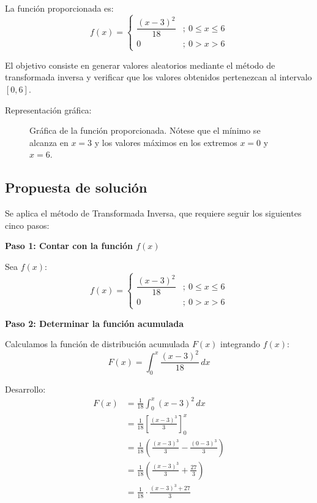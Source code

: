 \documentclass[12pt, a4paper]{article}
\begin{document}
La función proporcionada es:
\[
f(x)=\begin{cases}\dfrac{(x-3)^2}{18} &;\ 0 \leq x \leq 6 \\ 0 &;\ 0 > x > 6\end{cases}
\]

El objetivo consiste en generar valores aleatorios mediante el método de transformada inversa y verificar que los valores obtenidos pertenezcan al intervalo $[0,6]$.

Representación gráfica:

\begingroup
{}
\begin{figure}[H]
\centering
{}
\caption{Gráfica de la función proporcionada. Nótese que el mínimo se alcanza en $x=3$ y los valores máximos en los extremos $x=0$ y $x=6$.}
\end{figure}
\endgroup

\subsection{Propuesta de solución}

Se aplica el método de Transformada Inversa, que requiere seguir los siguientes cinco pasos:

\textbf{Paso 1: Contar con la función $f(x)$}

Sea $f(x)$:
\[
f(x)=\begin{cases}\dfrac{(x-3)^2}{18} &;\ 0 \leq x \leq 6 \\ 0 &;\ 0 > x > 6\end{cases}
\]

\textbf{Paso 2: Determinar la función acumulada}

Calculamos la función de distribución acumulada $F(x)$ integrando $f(x)$:
\[F(x) = \int_0^x \frac{(x-3)^2}{18}\, dx\]

Desarrollo:
\begin{align*}
F(x) &= \frac{1}{18} \int_0^x (x-3)^2\, dx \\[4pt]
     &= \frac{1}{18} \left[\frac{(x-3)^3}{3}\right]_0^x \\[4pt]
     &= \frac{1}{18} \left(\frac{(x-3)^3}{3} - \frac{(0-3)^3}{3}\right) \\[4pt]
     &= \frac{1}{18} \left(\frac{(x-3)^3}{3} + \frac{27}{3}\right) \\[4pt]
     &= \frac{1}{18} \cdot \frac{(x-3)^3 + 27}{3}
\end{align*}
\end{document}
